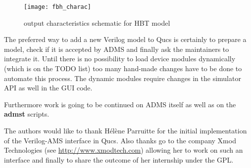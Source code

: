 \begin{figure}[ht]
\begin{center}
\texttt{[image: fbh\_charac]}
\end{center}
\caption{output characteristics schematic for HBT model}
\label{fig:fbh_charac}
\end{figure}
\FloatBarrier


The preferred way to add a new Verilog model to Qucs is certainly to
prepare a model, check if it is accepted by ADMS and finally ask the
maintainers to integrate it.  Until there is no possibility to load
device modules dynamically (which is on the TODO list) too many
hand-made changes have to be done to automate this process.  The
dynamic modules require changes in the simulator API as well in the
GUI code.

\addvspace{12pt}

Furthermore work is going to be continued on ADMS itself as well as on
the \textbf{admst} scripts.

\addvspace{12pt}

The authors would like to thank H\'el\`ene Parruitte for the initial
implementation of the Verilog-AMS interface in Qucs.  Also thanks go
to the company Xmod Technologies (see \url{http://www.xmodtech.com})
allowing her to work on such an interface and finally to share the
outcome of her internship under the GPL.

